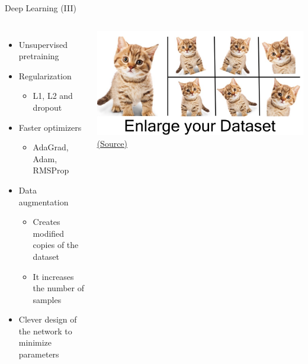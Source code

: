 \documentclass[10pt,compress]{beamer} %
\begin{document}
\begin{frame}{Deep Learning (III)}
    \begin{columns}
		\begin{itemize}
		\item Unsupervised pretraining
		\item Regularization
			\begin{itemize}
				\item L1, L2 and \alert{dropout}
			\end{itemize}
		\item Faster optimizers
			\begin{itemize}
				\item AdaGrad, Adam, RMSProp
			\end{itemize}
		\item \alert{Data augmentation} 
			\begin{itemize}
				\item Creates modified copies of the dataset
				\item It increases the number of samples
			\end{itemize}
        	\item Clever design of the network to minimize parameters
	\end{itemize}

	    	\centering \includegraphics[width=\linewidth]{figs/augmentation.png}\\
	    \scriptsize\href{https://medium.com/nanonets/how-to-use-deep-learning-when-you-have-limited-data-part-2-data-augmentation-c26971dc8ced}{(Source)}\\
    \end{columns}
\end{frame}
\end{document}
